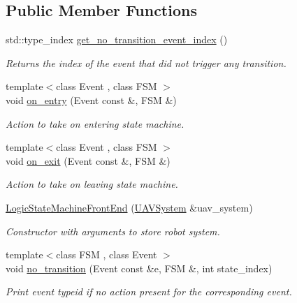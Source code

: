 \subsection*{Public Member Functions}
\begin{DoxyCompactItemize}
\item 
std\-::type\-\_\-index \hyperlink{classLogicStateMachineFrontEnd_af2ccbab79c14bc6570091b49a2e61fff}{get\-\_\-no\-\_\-transition\-\_\-event\-\_\-index} ()
\begin{DoxyCompactList}\small\item\em Returns the index of the event that did not trigger any transition. \end{DoxyCompactList}\item 
{\footnotesize template$<$class Event , class F\-S\-M $>$ }\\void \hyperlink{classLogicStateMachineFrontEnd_afea624ef452f4dd6f5380c96fd9555bb}{on\-\_\-entry} (Event const \&, F\-S\-M \&)
\begin{DoxyCompactList}\small\item\em Action to take on entering state machine. \end{DoxyCompactList}\item 
{\footnotesize template$<$class Event , class F\-S\-M $>$ }\\void \hyperlink{classLogicStateMachineFrontEnd_a86bc9dc7c6ab97285bb5c9ea06517da3}{on\-\_\-exit} (Event const \&, F\-S\-M \&)
\begin{DoxyCompactList}\small\item\em Action to take on leaving state machine. \end{DoxyCompactList}\item 
\hyperlink{classLogicStateMachineFrontEnd_a38a4d9fba9466fa36d012d297e8908ec}{Logic\-State\-Machine\-Front\-End} (\hyperlink{classUAVSystem}{U\-A\-V\-System} \&uav\-\_\-system)
\begin{DoxyCompactList}\small\item\em Constructor with arguments to store robot system. \end{DoxyCompactList}\item 
{\footnotesize template$<$class F\-S\-M , class Event $>$ }\\void \hyperlink{classLogicStateMachineFrontEnd_aa75b2a1500d4bfe052c5421aeefbf7ab}{no\-\_\-transition} (Event const \&e, F\-S\-M \&, int state\-\_\-index)
\begin{DoxyCompactList}\small\item\em Print event typeid if no action present for the corresponding event. \end{DoxyCompactList}\end{DoxyCompactItemize}
